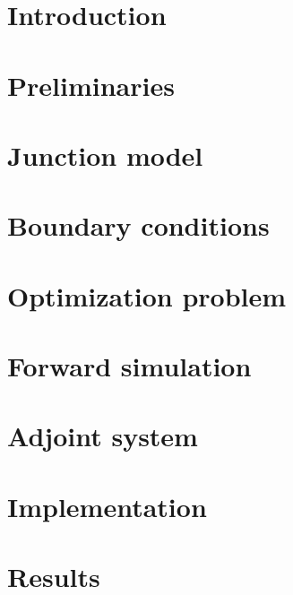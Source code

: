 
\section{Introduction}


\section{Preliminaries}


\section{Junction model}


\section{Boundary conditions}


\section{Optimization problem}


\section{Forward simulation}


\section{Adjoint system}


\section{Implementation}

\section{Results}
